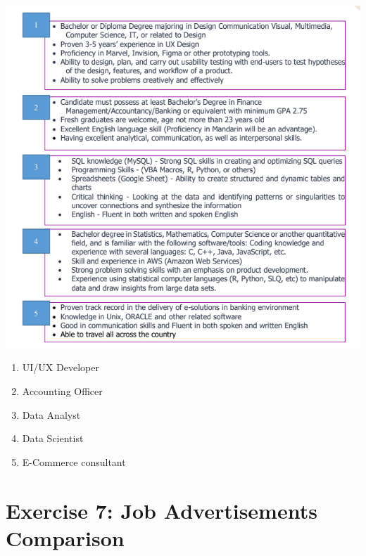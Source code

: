 \documentclass[12pt,titlepage]{article}
\begin{document}
\begin{center}
    \includegraphics*[width=.9\textwidth]{./images/jobdesc.png}
\end{center}

\begin{enumerate}
    \item UI/UX Developer
    \item Accounting Officer
    \item Data Analyst
    \item Data Scientist
    \item E-Commerce consultant
\end{enumerate}

\pagebreak

\section{Exercise 7: Job Advertisements Comparison}
\end{document}
